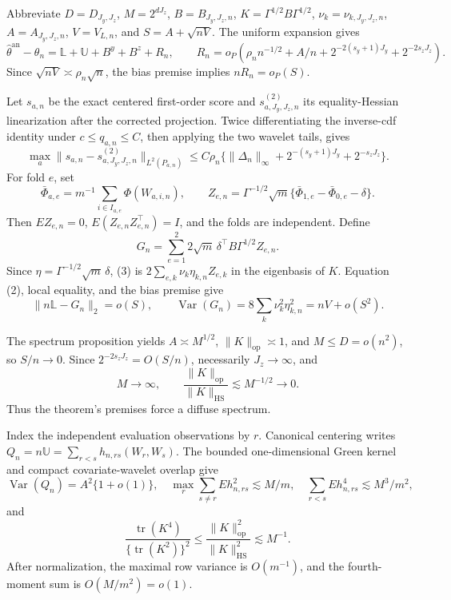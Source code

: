 Abbreviate \(D=D_{J_y,J_z}\), \(M=2^{dJ_z}\), \(B=B_{J_y,J_z,n}\), \(K=\Gamma^{1/2}B\Gamma^{1/2}\), \(\nu_k=\nu_{k,J_y,J_z,n}\), \(A=A_{J_y,J_z,n}\), \(V=V_{L,n}\), and \(S=A+\sqrt{nV}\).  The uniform expansion gives
\[
\widehat\theta^{\mathrm{an}}-\theta_n
=\mathbb L+\mathbb U+B^y+B^z+R_n,
\qquad
R_n=o_P\!\left(\rho_n n^{-1/2}+A/n+2^{-2(s_y+1)J_y}+2^{-2s_zJ_z}\right). \tag{1}
\]
Since \(\sqrt{nV}\asymp\rho_n\sqrt n\), the bias premise implies \(nR_n=o_P(S)\).

Let \(s_{a,n}\) be the exact centered first-order score and \(s^{(2)}_{a,J_y,J_z,n}\) its equality-Hessian linearization after the corrected projection.  Twice differentiating the inverse-cdf identity under \(c\le q_{a,n}\le C\), then applying the two wavelet tails, gives
\[
\max_a\|s_{a,n}-s^{(2)}_{a,J_y,J_z,n}\|_{L^2(P_{a,n})}
\le C\rho_n\{\|\Delta_n\|_\infty+2^{-(s_y+1)J_y}+2^{-s_zJ_z}\}.         \tag{2}
\]
For fold \(e\), set
\[
\bar\Phi_{a,e}=m^{-1}\sum_{i\in I_{a,e}}\Phi(W_{a,i,n}),
\qquad
Z_{e,n}=\Gamma^{-1/2}\sqrt m\{\bar\Phi_{1,e}-\bar\Phi_{0,e}-\delta\}.
\]
Then \(EZ_{e,n}=0\), \(E(Z_{e,n}Z_{e,n}^{\top})=I\), and the folds are independent.  Define
\[
G_n=\sum_{e=1}^2 2\sqrt m\,\delta^{\top}B\Gamma^{1/2}Z_{e,n}.             \tag{3}
\]
Since \(\eta=\Gamma^{-1/2}\sqrt m\,\delta\), (3) is \(2\sum_{e,k}\nu_k\eta_{k,n}Z_{e,k}\) in the eigenbasis of \(K\).  Equation (2), local equality, and the bias premise give
\[
\|n\mathbb L-G_n\|_2=o(S),
\qquad
\operatorname{Var}(G_n)=8\sum_k\nu_k^2\eta_{k,n}^2=nV+o(S^2).           \tag{4}
\]

The spectrum proposition yields \(A\asymp M^{1/2}\), \(\|K\|_{\mathrm{op}}\asymp1\), and \(M\le D=o(n^2)\), so \(S/n\to0\).  Since \(2^{-2s_zJ_z}=O(S/n)\), necessarily \(J_z\to\infty\), and
\[
M\to\infty,
\qquad
\frac{\|K\|_{\mathrm{op}}}{\|K\|_{\mathrm{HS}}}\lesssim M^{-1/2}\to0. \tag{5}
\]
Thus the theorem's premises force a diffuse spectrum.

Index the independent evaluation observations by \(r\).  Canonical centering writes \(Q_n=n\mathbb U=\sum_{r<s}h_{n,rs}(W_r,W_s)\).  The bounded one-dimensional Green kernel and compact covariate-wavelet overlap give
\[
\operatorname{Var}(Q_n)=A^2\{1+o(1)\},\quad
\max_r\sum_{s\ne r}Eh_{n,rs}^2\lesssim M/m,\quad
\sum_{r<s}Eh_{n,rs}^4\lesssim M^3/m^2,                                  \tag{6}
\]
and
\[
\frac{\operatorname{tr}(K^4)}{\{\operatorname{tr}(K^2)\}^2}
\le\frac{\|K\|_{\mathrm{op}}^2}{\|K\|_{\mathrm{HS}}^2}\lesssim M^{-1}. \tag{7}
\]
After normalization, the maximal row variance is \(O(m^{-1})\), and the fourth-moment sum is \(O(M/m^2)=o(1)\).

